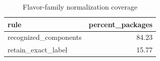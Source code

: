 \begin{table}
\caption{Flavor-family normalization coverage}
\begin{tabular}{lr}
\toprule
rule & percent\_packages \\
\midrule
recognized\_components & 84.23 \\
retain\_exact\_label & 15.77 \\
\bottomrule
\end{tabular}
\end{table}
